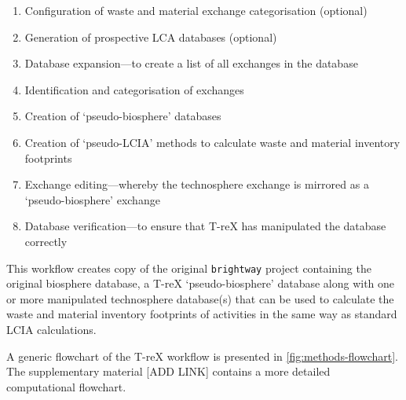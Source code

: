 \begin{enumerate}
    \item Configuration of waste and material exchange categorisation (optional)
    \item Generation of prospective LCA databases (optional)
    \item Database expansion---to create a list of all exchanges in the database
    \item Identification and categorisation of exchanges
    \item Creation of `pseudo-biosphere' databases
    \item Creation of `pseudo-LCIA' methods to calculate waste and material inventory footprints
    \item Exchange editing---whereby the technosphere exchange is mirrored as a `pseudo-biosphere' exchange
    \item Database verification---to ensure that T-reX has manipulated the database correctly
\end{enumerate}

This workflow creates copy of the original \texttt{brightway} project containing the original biosphere database, a T-reX `pseudo-biosphere' database along with one or more manipulated technosphere database(s) that can be used to calculate the waste and material inventory footprints of activities in the same way as standard LCIA calculations.

A generic flowchart of the T-reX workflow is presented in \autoref{fig:methods-flowchart}. The supplementary material [ADD LINK] contains a more detailed computational flowchart.

